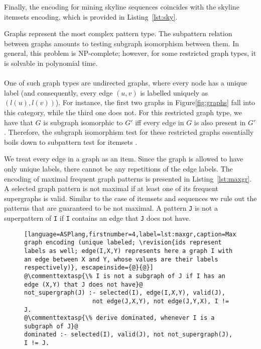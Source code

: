 \normalsize{Finally, %
the encoding for mining skyline sequences coincides with the skyline itemsets encoding, which is provided in Listing~\ref{lst:sky}. 


\normalsize{} Graphs represent the most complex pattern type. The subpattern relation between graphs amounts to testing subgraph isomorphism between them. In general, this problem is NP-complete; however, for some restricted graph types, it is solvable in polynomial time.

\paragraph{} One of such graph types are undirected graphs, where every node has a unique label (and consequently, every edge $(u, v)$ is labelled uniquely as $(l(u),l(v))$). For instance, the first two graphs in Figure\ref{fig:graphs} fall into this category, while the third one does not. For this restricted graph type, we have that $G$ is subgraph isomorphic to $G'$ iff every edge in $G$ is also present in $G'$. Therefore, the subgraph isomorphism test for these restricted graphs essentially boils down to subpattern test for itemsets \parencite{DBLP:journals/corr/abs-1709-00900}.

We treat every edge in a graph as an item. Since the graph is allowed to have only unique labels, there cannot be any repetitions of the edge labels. The encoding of maximal frequent graph patterns is presented in Listing~\ref{lst:maxgr}. A selected graph pattern is not maximal if at least one of its frequent supergraphs is valid. Similar to the case of itemsets and sequences we rule out the patterns that are guaranteed to be not maximal. A pattern \texttt{J} is not a superpattern of \texttt{I} if \texttt{I} contains an edge that \texttt{J} does not have.  

\begin{figure}[t]
    \small{\begin{lstlisting}[language=ASPlang,firstnumber=4,label=lst:maxgr,caption=Maximal graph encoding (unique labeled; \revision{ids represent labels as well; edge(I,X,Y) represents here a graph I with an edge between X and Y, whose values are their labels respectively)}, escapeinside={@}{@}]
@\commenttextasp{\% I is not a subgraph of J if I has an edge (X,Y) that J does not have}@
not_supergraph(J) :- selected(I), edge(I,X,Y), valid(J),
                   not edge(J,X,Y), not edge(J,Y,X), I != J.
@\commenttextasp{\% derive dominated, whenever I is a subgraph of J}@
dominated :- selected(I), valid(J), not not_supergraph(J), I != J.
\end{lstlisting}}
\end{figure}

}
